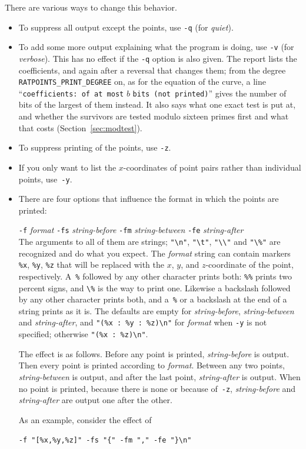 \documentclass[12pt,a4paper,oneside]{amsart}
\begin{document}
There are various ways to change this behavior.
\begin{itemize}\setlength{\parindent}{0mm}\setlength{\parskip}{1ex}
  \item To suppress all output except the points, use \verb+-q+ (for
        {\em quiet}).
  \item To add some more output explaining what the program is doing,
        use \verb+-v+ (for {\em verbose}). This has no effect if
        the \verb+-q+ option is also given. The report lists the
        coefficients, and again after a reversal that changes them; from
        the degree \texttt{RATPOINTS\_PRINT\_DEGREE} on, as for the
        equation of the curve, a line ``\verb+coefficients: of at most+
        $b$ \verb+bits (not printed)+'' gives the number of bits of the
        largest of them instead.  It also says what one exact test is put
        at, and whether the survivors are tested modulo sixteen primes
        first and what that costs (Section~\ref{sec:modtest}).
  \item To suppress printing of the points, use \verb+-z+.
  \item If you only want to list the $x$-coordinates of point pairs rather
        than individual points, use~\verb+-y+.
  \item There are four options that influence the format in which the
        points are printed: \\
        \strut\quad \verb+-f+ {\em format} \verb+-fs+ {\em string-before}
        \verb+-fm+ {\em string-between} \verb+-fe+ {\em string-after} \\
        The arguments to all of them are strings; \verb+"\n"+, \verb+"\t"+,
        \verb+"\\"+ and \verb+"\%"+ are recognized and do what you expect.
        The {\em format} string can contain markers \verb+%x+, \verb+%y+,
        \verb+%z+ that will be replaced with the $x$, $y$, and $z$-coordinate
        of the point, respectively. A~\verb+%+ followed by any other
        character prints both: \verb+%%+ prints two percent signs, and
        \verb+\%+ is the way to print one. Likewise a backslash followed by
        any other character prints both, and a~\verb+%+ or a backslash at
        the end of a string prints as it is. The defaults are empty for
        {\em string-before}, {\em string-between} and {\em string-after},
        and \verb+"(%x : %y : %z)\n"+ for {\em format} when \verb+-y+
        is not specified; otherwise \verb+"(%x : %z)\n"+.

        The effect is as follows. Before any point is printed,
        {\em string-before} is output. Then every point is printed
        according to {\em format}. Between any two points, {\em string-between}
        is output, and after the last point, {\em string-after} is output.
        When no point is printed, because there is none or because
        of~\verb+-z+, {\em string-before} and {\em string-after} are output
        one after the other.

        As an example, consider the effect of \\
        \strut\quad\verb+-f "[%x,%y,%z]" -fs "{" -fm "," -fe "}\n"+
\end{itemize}
\end{document}

